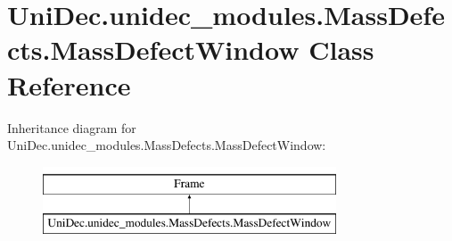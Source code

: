 \hypertarget{class_uni_dec_1_1unidec__modules_1_1_mass_defects_1_1_mass_defect_window}{}\section{Uni\+Dec.\+unidec\+\_\+modules.\+Mass\+Defects.\+Mass\+Defect\+Window Class Reference}
\label{class_uni_dec_1_1unidec__modules_1_1_mass_defects_1_1_mass_defect_window}
Inheritance diagram for Uni\+Dec.\+unidec\+\_\+modules.\+Mass\+Defects.\+Mass\+Defect\+Window\+:\begin{figure}[H]
\begin{center}
\leavevmode
\includegraphics[height=2.000000cm]{class_uni_dec_1_1unidec__modules_1_1_mass_defects_1_1_mass_defect_window}
\end{center}
\end{figure}
